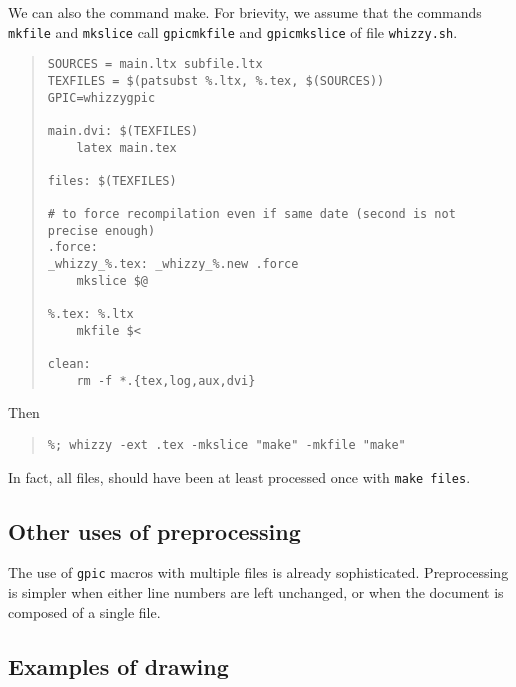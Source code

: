 \documentclass{article}
\let \lst \verb
\begin{document}
We can also the command make. For brievity, we assume that 
the commands \texttt{mkfile} and \texttt{mkslice} 
call \texttt{gpicmkfile} and \texttt{gpicmkslice} of file
\texttt{whizzy.sh}. 
\begin{quote}
\begin{verbatim}
SOURCES = main.ltx subfile.ltx
TEXFILES = $(patsubst %.ltx, %.tex, $(SOURCES))
GPIC=whizzygpic

main.dvi: $(TEXFILES)
	latex main.tex

files: $(TEXFILES)

# to force recompilation even if same date (second is not precise enough)
.force:
_whizzy_%.tex: _whizzy_%.new .force
	mkslice $@

%.tex: %.ltx
	mkfile $<

clean:
	rm -f *.{tex,log,aux,dvi}
\end{verbatim}
\end{quote}
Then
\begin{quote}\small
\begin{verbatim}
%; whizzy -ext .tex -mkslice "make" -mkfile "make"
\end{verbatim}
\end{quote}
In fact, all files, should have been at least processed once with 
\lst"make files". 



\subsection* {Other uses of preprocessing}

The use of {\tt gpic} macros with multiple files is already sophisticated. 
Preprocessing is simpler when either  line numbers are left unchanged, or 
when the document is composed of a single file. 

\subsection* {Examples of drawing}
\end{document}
